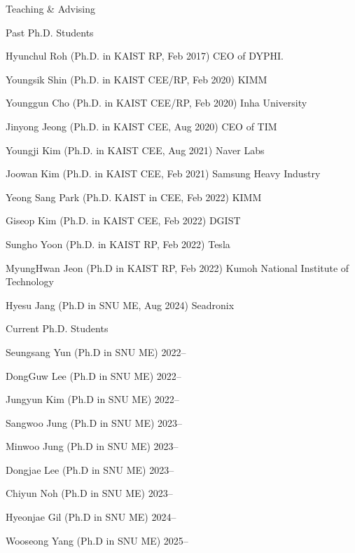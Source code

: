 \begin{rSection}{Teaching \& Advising}
\begin{rSubsection}{Past Ph.D. Students}{}{}{} 
  \item Hyunchul Roh (Ph.D. in KAIST \ac{RP}, Feb 2017) \hfill CEO of DYPHI.
  \item Youngsik Shin (Ph.D. in KAIST \ac{CEE}/\ac{RP}, Feb 2020) \hfill KIMM
  \item Younggun Cho (Ph.D. in KAIST \ac{CEE}/\ac{RP}, Feb 2020) \hfill Inha University
  \item Jinyong Jeong (Ph.D. in KAIST \ac{CEE}, Aug 2020) \hfill CEO of TIM
  \item Youngji Kim (Ph.D. in KAIST \ac{CEE}, Aug 2021) \hfill Naver Labs
  \item Joowan Kim (Ph.D. in KAIST \ac{CEE}, Feb 2021) \hfill Samsung Heavy Industry
  \item Yeong Sang Park (Ph.D. KAIST in \ac{CEE}, Feb 2022) \hfill KIMM
  \item Giseop Kim (Ph.D. in KAIST \ac{CEE}, Feb 2022) \hfill DGIST
  \item Sungho Yoon (Ph.D. in KAIST \ac{RP}, Feb 2022) \hfill Tesla
  \item MyungHwan Jeon (Ph.D in KAIST \ac{RP}, Feb 2022) \hfill Kumoh National Institute of Technology
  \item Hyesu Jang (Ph.D in SNU \ac{ME}, Aug 2024) \hfill Seadronix
\end{rSubsection}

\begin{rSubsection}{Current Ph.D. Students}{}{}{}
  \item Seungsang Yun (Ph.D in SNU \ac{ME}) \hfill 2022--
  \item DongGuw Lee (Ph.D in SNU \ac{ME}) \hfill 2022--
  \item Jungyun Kim (Ph.D in SNU \ac{ME}) \hfill 2022--
  \item Sangwoo Jung (Ph.D in SNU \ac{ME}) \hfill 2023--
  \item Minwoo Jung (Ph.D in SNU \ac{ME}) \hfill 2023--
  \item Dongjae Lee (Ph.D in SNU \ac{ME}) \hfill 2023--
  \item Chiyun Noh (Ph.D in SNU \ac{ME}) \hfill 2023--
  \item Hyeonjae Gil (Ph.D in SNU \ac{ME}) \hfill 2024--
  \item Wooseong Yang (Ph.D in SNU \ac{ME}) \hfill 2025--
\end{rSubsection}


\end{rSection}
